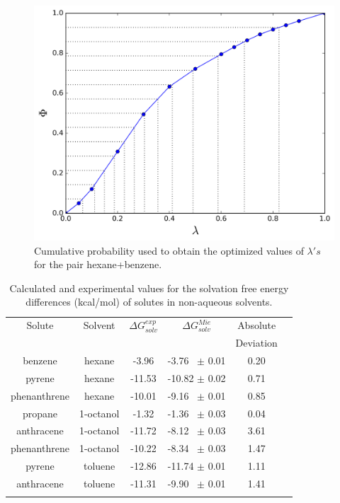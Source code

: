 \documentclass[final,12p,times,twocolumn]{elsarticle}
\begin{document}
	\begin{figure}[h]
		\centering
		\includegraphics[width=0.8\linewidth]{Figures/optimized_cdf}
		\caption{Cumulative probability used to obtain the optimized values of $\lambda 's$ for the pair hexane+benzene.}
		\label{fig:optimized_cdf}
	\end{figure}
	
	\begin{table}[h]
		\centering
		\caption{Calculated and experimental values for the solvation free energy differences (kcal/mol) of solutes in non-aqueous solvents.}
		\label{tbl:solv1}
		\begin{tabular}{cccccc}
			\hline\hline
			Solute       & Solvent   & $\Delta G_{solv}^{exp}$ & $\Delta G_{solv}^{Mie}$ & Absolute  &  \\
			&           &                         &                         & Deviation &  \\ \hline
			benzene      & hexane    & -3.96                   & -3.76  $\,$ $\pm$ 0.01       & 0.20      &  \\
			pyrene       & hexane    & -11.53                  & -10.82 $\pm$ 0.02       & 0.71      &  \\
			phenanthrene & hexane    & -10.01                  & -9.16  $\,$ $\pm$ 0.01       & 0.85      &  \\
			propane      & 1-octanol & -1.32                   & -1.36  $\,$ $\pm$ 0.03       & 0.04      &  \\
			anthracene   & 1-octanol & -11.72                  & -8.12   $\,$ $\pm$ 0.03       & 3.61      &  \\
			phenanthrene & 1-octanol & -10.22                  & -8.34  $\,$ $\pm$ 0.03       & 1.47      &  \\
			pyrene       & toluene   & -12.86                  & -11.74 $\pm$ 0.01       & 1.11      &  \\
			anthracene   & toluene   & -11.31                  & -9.90 $\,$ $\pm$ 0.01        & 1.41      &  \\ \hline\hline
			&
		\end{tabular}
	\end{table}
	
\end{document}
